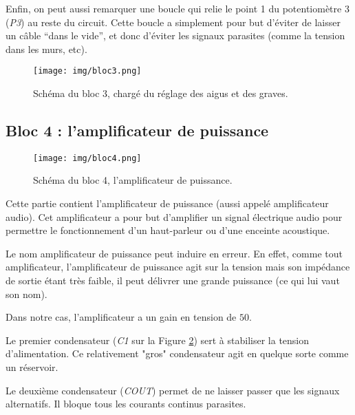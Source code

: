 Enfin, on peut aussi remarquer une boucle qui relie le point 1 du potentiomètre 3 (\textit{P3}) au reste du circuit. Cette boucle a simplement pour but d'éviter de laisser un câble "`dans le vide"', et donc d'éviter les signaux parasites (comme la tension dans les murs, etc).

\begin{figure}[h]
	\centering
	\texttt{[image: img/bloc3.png]}
	\caption{Schéma du bloc 3, chargé du réglage des aigus et des graves.}
	\label{bloc3}
\end{figure}

\subsection{Bloc 4 : l'amplificateur de puissance}

\begin{figure}[h]
	\centering
	\texttt{[image: img/bloc4.png]}
	\caption{Schéma du bloc 4, l'amplificateur de puissance.}
	\label{bloc4}
\end{figure}

Cette partie contient l'amplificateur de puissance (aussi appelé amplificateur audio). 
Cet amplificateur a pour but d'amplifier un signal électrique audio pour
permettre le fonctionnement d'un haut-parleur ou d'une enceinte acoustique.

Le nom amplificateur de puissance peut induire en erreur. En effet, comme tout amplificateur,
l'amplificateur de puissance agit sur la tension mais son impédance de sortie étant très faible,
il peut délivrer une grande puissance (ce qui lui vaut son nom).

Dans notre cas, l'amplificateur a un gain en tension de $50$.

Le premier condensateur (\textit{C1} sur la Figure \ref{bloc4}) sert à stabiliser la tension d'alimentation. Ce relativement "gros" condensateur
agit en quelque sorte comme un réservoir.

Le deuxième condensateur (\textit{COUT}) permet de ne laisser passer que les signaux alternatifs. Il bloque tous les courants continus parasites.

